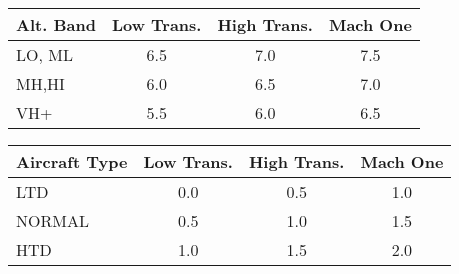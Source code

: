 
\begin{onecolumntablefloat}[p]
\begin{onecolumntable}
\begin{tabularx}{1.0\linewidth}{Xccc}
\toprule
Alt. Band&Low Trans.&High Trans.&Mach One\\
\midrule
LO, ML&6.5&7.0&7.5\\
MH,HI&6.0&6.5&7.0\\
VH+&5.5&6.0&6.5\\
\bottomrule
\end{tabularx}
\end{onecolumntable}
\end{onecolumntablefloat}

\begin{onecolumntablefloat}[p]
\begin{onecolumntable}
\begin{tabularx}{1.0\linewidth}{Xccc}
\toprule
Aircraft Type&Low Trans.&High Trans.&Mach One\\
\midrule
LTD&0.0&0.5&1.0\\
NORMAL&0.5&1.0&1.5\\
HTD&1.0&1.5&2.0\\
\bottomrule
\end{tabularx}
\end{onecolumntable}
\end{onecolumntablefloat}

